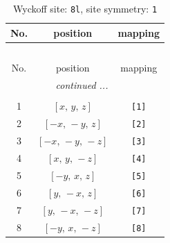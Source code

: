 \documentclass[fleqn,8pt]{jsarticle}
\begin{document}
\renewcommand{\arraystretch}{1.2}
\begin{longtable}{ccc}
\caption{Wyckoff site: {\tt 8l}, site symmetry: {\tt 1}}
 \\
 \hline \hline
No. & position & mapping \\ \hline \endfirsthead

\multicolumn{2}{l}{\tablename\ \thetable{}} \\
 \hline \hline
No. & position & mapping \\ \hline \endhead

 \hline \hline
\multicolumn{2}{r}{\footnotesize\it continued ...} \\ \endfoot

 \hline \hline
\multicolumn{2}{r}{} \\ \endlastfoot

1 & $\left[ x,\, y,\, z \right]$ & {\tt [1]} \\ \hline
2 & $\left[ - x,\, - y,\, z \right]$ & {\tt [2]} \\ \hline
3 & $\left[ - x,\, - y,\, - z \right]$ & {\tt [3]} \\ \hline
4 & $\left[ x,\, y,\, - z \right]$ & {\tt [4]} \\ \hline
5 & $\left[ - y,\, x,\, z \right]$ & {\tt [5]} \\ \hline
6 & $\left[ y,\, - x,\, z \right]$ & {\tt [6]} \\ \hline
7 & $\left[ y,\, - x,\, - z \right]$ & {\tt [7]} \\ \hline
8 & $\left[ - y,\, x,\, - z \right]$ & {\tt [8]} \\
\end{longtable}
\end{document}

